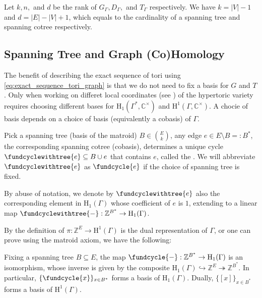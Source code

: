 \documentclass[b5paper]{article}
\newcommand{\ZZ}{\mathbb{Z}}
\newcommand{\del}{\setminus}
\newcommand{\HH}{\mathrm{H}}
\begin{document}
Let $k,n,$ and $d$ be the rank of $G_\Gamma,D_\Gamma,$ and $T_\Gamma$ respectively. We have $k=|V|-1$ and $d=|E|-|V|+1$, which equals to the cardinality of a spanning tree and spanning cotree respectively. 

\subsection{Spanning Tree and Graph (Co)Homology}

The benefit of describing the exact sequence of tori using \ref{eq:exact_sequence_tori_graph} is that we do not need to fix a basis for $G$ and $T$.
Only when working on differet local coordinates (see ) of the hypertoric variety requires choosing different bases for $\HH_1(\Gamma^*,\mathbb{C}^\times )$ and $\HH^1(\Gamma,\mathbb{C}^\times )$.
A chocie of basis depends on a choice of basis (equivalently a cobasis) of $\Gamma$.

\begin{definition}[def:]{}
  Pick a spanning tree (basis of the matroid) $B\in \binom{E}{k}$, any edge $e\in E\del B=:B^*$, the corresponding spanning cotree (cobasis), determines a unique cycle $\fundcyclewithtree{e}\subseteq B\cup e$ that contains $e$, called the .
  We will abbreviate $\fundcyclewithtree{e}$ as $\fundcycle{e}$ if the choice of spanning tree is fixed.
\end{definition}
By abuse of notation, we denote by $\fundcyclewithtree{e}$ also the corresponding element in $\HH_1(\Gamma)$ whose coefficient of $e$ is $1$, extending to a linear map $ \fundcyclewithtree{-} : \ZZ^{B^*} \to \HH_1(\Gamma) $. 

By the definition of $\pi:\mathbb{Z}^E\rightarrow \HH^1(\Gamma)$ is the dual representation of $\Gamma$, or one can prove using the matroid axiom, we have the following:

\begin{theorem}{}
  Fixing a spanning tree $B \subseteq E$, the map $ \fundcycle{-}: \ZZ^{B^*} \to \HH_1(\Gamma) $ is an isomorphism, whose inverse is given by the composite $ \HH_1(\Gamma) \hookrightarrow \ZZ^E \twoheadrightarrow \ZZ^{B^*} $. 
  In particular, $\{\fundcycle{x}\}_{x \in B^*}$ forms a basis of $\HH_1(\Gamma)$. Dually, $\{[x]\}_{x \in B^*}$ forms a basis of $\HH^1(\Gamma)$. 
\end{theorem}
\end{document}
